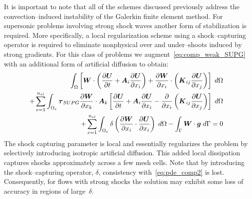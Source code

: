 It is important to note that all of the schemes discussed previously address the convection--induced instability of the Galerkin finite element method.  For supersonic problems involving strong shock waves another form of stabilization is required.  More specifically, a local regularization scheme using a shock--capturing operator is required to eliminate nonphysical over and under--shoots induced by strong gradients.  For this class of problems we augment~\eqref{eq:comp_weak_SUPG} with an additional form of artificial diffusion to obtain:
\begin{eqnarray}
  \label{eq:comp_weak_SUPG_SC}
  \int_\Omega  \left[ {\boldsymbol{W}}\cdot\left({\frac{\partial{{\boldsymbol{U}}}}{\partial{t}}} + {\boldsymbol{A}}_i {\frac{\partial{{\boldsymbol{U}}}}{\partial{x_i}}} \right) + {\frac{\partial{{\boldsymbol{W}}}}{\partial{x_i}}} \cdot \left( {\boldsymbol{K}}_{ij} {\frac{\partial{{\boldsymbol{U}}}}{\partial{x_j}}} \right) \right] \; d\Omega \nonumber \\
  + \sum_{e=1}^{n_{el}} \int_{\Omega_e} {\boldsymbol{\tau}}_{SUPG} {\frac{\partial{{\boldsymbol{W}}}}{\partial{x_k}}}\cdot{\boldsymbol{A}}_k
  \left[ {\frac{\partial{{\boldsymbol{U}}}}{\partial{t}}} + {\boldsymbol{A}}_i {\frac{\partial{{\boldsymbol{U}}}}{\partial{x_i}}} - {\frac{\partial{}}{\partial{x_i}}} \left( {\boldsymbol{K}}_{ij} {\frac{\partial{{\boldsymbol{U}}}}{\partial{x_j}}} \right) \right] \; d\Omega  \nonumber \\
  + \sum_{e=1}^{n_{el}} \int_{\Omega_e} \delta \left({\frac{\partial{{\boldsymbol{W}}}}{\partial{x_i}}}\cdot{\frac{\partial{{\boldsymbol{U}}}}{\partial{x_i}}}\right)\; d\Omega
   -\int_\Gamma {\boldsymbol{W}}\cdot{\boldsymbol{g}} \; d\Gamma = 0
\end{eqnarray}
The shock capturing parameter is local and essentially regularizes the problem by selectively introducing isotropic artificial diffusion. This added local dissipation captures shocks approximately across a few mesh cells.  Note that by introducing the shock--capturing operator, $\delta$, consistency with~\eqref{eq:pde_comp2} is lost.  Consequently, for flows with strong shocks the solution may exhibit some loss of accuracy in regions of large~$\delta$.  

